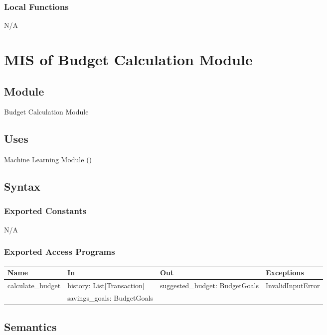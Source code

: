 \documentclass[12pt, titlepage]{article}
\begin{document}
\subsubsection{Local Functions}
N/A

\newpage



\section{MIS of Budget Calculation Module}\label{budget_calculation_module}

\subsection{Module}

Budget Calculation Module

\subsection{Uses}
Machine Learning Module ()

\subsection{Syntax}

\subsubsection{Exported Constants}
N/A

\subsubsection{Exported Access Programs}

\begin{center}
\begin{tabular}{p{4cm} p{4cm} p{4cm} p{4cm}}
\hline
\textbf{Name} & \textbf{In} & \textbf{Out} & \textbf{Exceptions} \\
\hline
calculate\_budget & history: List[Transaction] & suggested\_budget: BudgetGoals
& InvalidInputError \\
& savings\_goals: BudgetGoals & &  \\
\hline
\end{tabular}
\end{center}

\subsection{Semantics}
\end{document}

